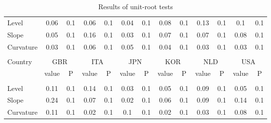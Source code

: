 \documentclass[12pt,bibliography=totoc]{article}
\begin{document}
\begin{appendices}
\begin{table}
\begin{subtable}[t]{1\textwidth}
\begin{tabular}{l cc cc cc cc cc cc}
Level	&	0.06 & 0.1 & 0.06 & 0.1 & 0.04 & 0.1 & 0.08 & 0.1 & 0.13 & 0.1 & 0.1 & 0.1	\\
Slope	&	0.05 & 0.1 & 0.16 & 0.1 & 0.03 & 0.1 & 0.07 & 0.1 & 0.07 & 0.1 & 0.08 & 0.1\\
Curvature	&	0.03 & 0.1 & 0.06 & 0.1 & 0.05 & 0.1 & 0.04 & 0.1 & 0.03 & 0.1 & 0.03 & 0.1\\


\hline   \\ [-1.5ex]    

Country	&	\multicolumn{2}{c}{GBR}			&	\multicolumn{2}{c}{ITA}			&	\multicolumn{2}{c}{JPN}			&	\multicolumn{2}{c}{KOR}			&	\multicolumn{2}{c}{NLD}			&	\multicolumn{2}{c}{USA}			\\

 & value &P & value &P& value &P & value &P& value &P & value &P\\

\hline       \\ [-1.5ex] 

Level	&	0.11 & 0.1 & 0.14 & 0.1 & 0.03 & 0.1 & 0.05 & 0.1 & 0.09 & 0.1 & 0.05 & 0.1	\\
Slope	&	0.24 & 0.1 & 0.07 & 0.1 & 0.02 & 0.1 & 0.06 & 0.1 & 0.09 & 0.1 & 0.14 & 0.1 \\
Curvature	&	0.11 & 0.1 & 0.02 & 0.1 & 0.1 & 0.1 & 0.02 & 0.1 & 0.03 & 0.1 & 0.08 & 0.1	\\


\hline
\end{tabular}
\caption{\textbf{KPSS(1) test results}}
\end{subtable}
\hspace{\fill}
\caption{Results of unit-root tests}
\end{table}




\end{appendices}
\end{document}
